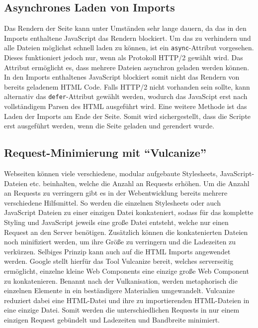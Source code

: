 \subsection{Asynchrones Laden von Imports}\label{asynchrones-laden-von-imports}

Das Rendern der Seite kann unter Umständen sehr lange dauern, da das in den Imports enthaltene JavaScript das Rendern blockiert. Um das zu verhindern und alle Dateien möglichst schnell laden zu können, ist ein \texttt{async}-Attribut vorgesehen. Dieses funktioniert jedoch nur, wenn als Protokoll \ac{HTTP}/2 gewählt wird. Das Attribut ermöglicht es, dass mehrere Dateien asynchron geladen werden können. In den Imports enthaltenes JavaScript blockiert somit nicht das Rendern von bereits geladenem \ac{HTML} Code. Falls \ac{HTTP}/2 nicht vorhanden sein sollte, kann alternativ das \texttt{defer}-Attribut gewählt werden, wodurch das JavaScipt erst nach vollständigem Parsen des \ac{HTML} ausgeführt wird. Eine weitere Methode ist das Laden der Imports am Ende der Seite. Somit wird sichergestellt, dass die Scripte erst ausgeführt werden, wenn die Seite geladen und gerendert wurde.


\subsection{\texorpdfstring{Request-Minimierung mit ``Vulcanize''}{Request-Minimierung mit Vulcanize}}\label{request-minimierung-mit-vulcanize}

Webseiten können viele verschiedene, modular aufgebaute Stylesheets, JavaScript-Dateien etc. beinhalten, welche die Anzahl an Requests erhöhen. Um die Anzahl an Requests zu verringern gibt es in der Webentwicklung bereits mehrere verschiedene Hilfsmittel. So werden die einzelnen Stylesheets oder auch JavaScript Dateien zu einer einzigen Datei konkateniert, sodass für das komplette Styling und JavaScript jeweils eine große Datei entsteht, welche nur einen Request an den Server benötigen. Zusätzlich können die konkatenierten Dateien noch minifiziert werden, um ihre Größe zu verringern und die Ladezeiten zu verkürzen. Selbiges Prinzip kann auch auf die \ac{HTML} Imports angewendet werden. Google stellt hierfür das Tool Vulcanize \cite{citeulike:13879681} bereit, welches serverseitig ermöglicht, einzelne kleine Web Components eine einzige große Web Component zu konkatenieren. Benannt nach der Vulkanisation, werden metaphorisch die einzelnen Elemente in ein beständigere Materialien umgewandelt. Vulcanize reduziert dabei eine \ac{HTML}-Datei und ihre zu importierenden \ac{HTML}-Dateien in eine einzige Datei. Somit werden die unterschiedlichen Requests in nur einem einzigen Request gebündelt und Ladezeiten und Bandbreite minimiert.


